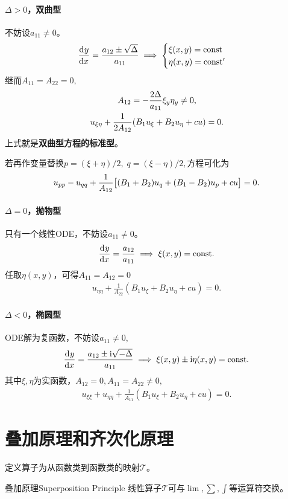 \paragraph{$\Delta > 0$，双曲型}不妨设$a_{11} \neq 0$。
\begin{align}
	\frac{\mathop{}\!\mathrm{d}^{}y}{\mathrm{d}{x}^{}} = \frac{a_{12} \pm \sqrt\Delta}{a_{11}} \implies
	\begin{cases}
		\xi(x,y) = \mathrm{const} \\
		\eta(x,y) = \mathrm{const}'
	\end{cases}
\end{align}
继而$A_{11} = A_{22} = 0,$
\begin{gather}\notag
	A_{12} = -\frac{2\Delta}{a_{11}}\xi_y\eta_y \neq 0,\\
	u_{\xi\eta} + \frac1{2A_{12}}(B_1u_\xi + B_2u_\eta + cu) = 0.
\end{gather}
上式就是\textbf{双曲型方程的标准型}。

若再作变量替换$p = (\xi + \eta)/2,\;q = (\xi - \eta)/2,$方程可化为
\begin{align}
	u_{pp} - u_{qq} + \frac1{A_{12}}\bigl[(B_1 + B_2)u_q + (B_1 - B_2)u_p + cu\bigr] = 0.
\end{align}
\paragraph{$\Delta = 0$，抛物型}只有一个线性ODE，不妨设$a_{11} \neq 0$。
\begin{align}
	\frac{\mathop{}\!\mathrm{d}^{}y}{\mathrm{d}{x}^{}} = \frac{a_{12}}{a_{11}} \implies \xi(x,y) = \mathrm{const}.
\end{align}
任取$\eta(x,y)$，可得$A_{11} = A_{12} = 0$
\begin{align}
	u_{\eta\eta} + \frac1{A_{22}}(B_1u_\xi + B_2u_\eta + cu) = 0.
\end{align}
\paragraph{$\Delta < 0$，椭圆型}ODE解为复函数，不妨设$a_{11} \neq 0,$
\begin{align}
	\frac{\mathop{}\!\mathrm{d}^{}y}{\mathrm{d}{x}^{}} = \frac{a_{12} \pm \mathrm{i}\sqrt{-\Delta}}{a_{11}} \implies \xi(x,y) \pm \mathrm{i}\eta(x,y) = \mathrm{const}.
\end{align}
其中$\xi,\eta$为实函数，$A_{12} = 0,A_{11} = A_{22} \neq 0,$
\begin{align}
	u_{\xi\xi} + u_{\eta\eta} + \frac1{A_{11}}(B_1u_\xi + B_2u_\eta + cu) = 0.
\end{align}
\section{叠加原理和齐次化原理}
定义算子为从函数类到函数类的映射$\mathcal T$。
\begin{theorem}{叠加原理}{Superposition Principle}
	线性算子$\mathcal T$可与$\textstyle\lim,\sum,\int$等运算符交换。%
\end{theorem}

